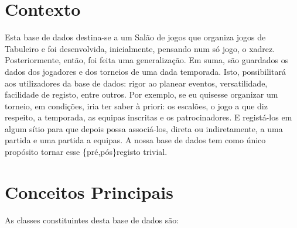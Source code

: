 \documentclass[a4paper]{article}
\begin{document}
\newpage






\section{Contexto}
Esta base de dados destina-se a um Salão de jogos que organiza jogos de Tabuleiro e foi desenvolvida, inicialmente, pensando num só jogo, o xadrez. Posteriormente, então, foi feita uma generalização. Em suma, são guardados os dados dos jogadores e dos torneios de uma dada temporada. Isto, possibilitará aos utilizadores da base de dados: rigor ao planear eventos, versatilidade, facilidade de registo, entre outros. Por exemplo, se eu quisesse organizar um torneio, em condições, iria ter saber à priori: os escalões, o jogo a que diz respeito, a temporada, as equipas inscritas e os patrocinadores. E registá-los em algum sítio para que depois possa associá-los, direta ou indiretamente, a uma partida e uma partida a equipas. A nossa base de dados tem como único propósito tornar esse \{pré,pós\}registo trivial.

\section{Conceitos Principais}


As classes constituintes desta base de dados são:
\end{document}
